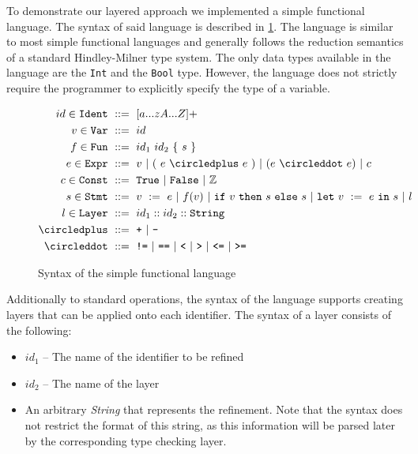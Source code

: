\documentclass[acmsmall, review, screen]{acmart}
\begin{document}
To demonstrate our layered approach we implemented a simple functional language. The syntax of said language is described in \ref{fig:lang}. The language is similar to most simple functional languages and generally follows the reduction semantics of a standard Hindley-Milner type system. The only data types available in the language are the \texttt{Int} and the \texttt{Bool} type. However, the language does not strictly require the programmer to explicitly specify the type of a variable.

\begin{figure}[ht!]
\begin{align*}
	id \in \texttt{Ident}\ 	&::=\ [a...zA...Z]+ \\
	v \in \texttt{Var}\ 	&::=\ id \\
	f \in \texttt{Fun}\ 	&::=\ id_1\ id_2\ \{\ s\ \}\\
	e \in \texttt{Expr}\ 	&::=\ v\ |\ (\ e\ \circledplus\ e\ )\ |\ (e\ \circleddot\ e)\ |\ c \\
	c \in \texttt{Const}\ 	&::=\ \texttt{True}\ |\ \texttt{False}\ |\ \mathbb{Z} \\
	s \in \texttt{Stmt}\ 	&::=\ v\ :=\ e\ |\ f(v)\ |\ \texttt{if}\ v\ \texttt{then}\ s\ \texttt{else}\ s\ |\ \texttt{let}\ v\ :=\ e\ \texttt{in}\ s\ |\ l \\
	l \in \texttt{Layer}\ 	&::=\ id_1::id_2::\texttt{String} \\
	\circledplus\ 		&::=\ \texttt{+}\ |\ \texttt{-} \\
	\circleddot\ 		&::=\ \texttt{!=}\ |\ \texttt{==}\ |\ \texttt{<} \ |\ \texttt{>} \ |\ \texttt{<=} \ |\ \texttt{>=} \\
\end{align*}
\caption{Syntax of the simple functional language}
\label{fig:lang}
\end{figure}

Additionally to standard operations, the syntax of the language supports creating layers that can be applied onto each identifier. The syntax of a layer consists of the following:
\begin{itemize}
	\item $id_1$ -- The name of the identifier to be refined
	\item $id_2$ -- The name of the layer
	\item An arbitrary \textit{String} that represents the refinement. Note that the syntax does not restrict the format of this string, as this information will be parsed later by the corresponding type checking layer.
\end{itemize}
\end{document}
